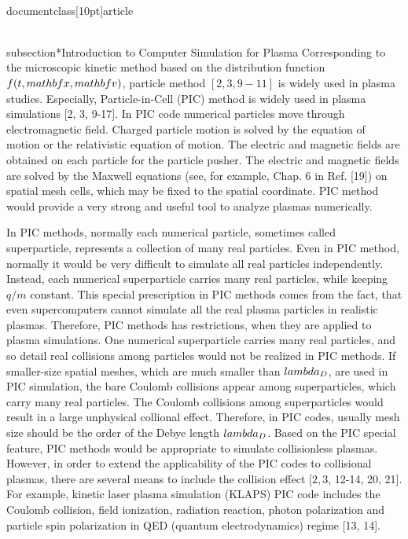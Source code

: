 \\documentclass[10pt]{article}
\begin{document}
\\subsection*{Introduction to Computer Simulation for Plasma}
Corresponding to the microscopic kinetic method based on the distribution function $f(t, \\mathbf{x}, \\mathbf{v})$, particle method $[2,3,9-11]$ is widely used in plasma studies. Especially, Particle-in-Cell (PIC) method is widely used in plasma simulations [2, 3, 9-17]. In PIC code numerical particles move through electromagnetic field. Charged particle motion is solved by the equation of motion or the relativistic equation of motion. The electric and magnetic fields are obtained on each particle for the particle pusher. The electric and magnetic fields are solved by the Maxwell equations (see, for example, Chap. 6 in Ref. [19]) on spatial mesh cells, which may be fixed to the spatial coordinate. PIC method would provide a very strong and useful tool to analyze plasmas numerically.

In PIC methods, normally each numerical particle, sometimes called superparticle, represents a collection of many real particles. Even in PIC method, normally it would be very difficult to simulate all real particles independently. Instead, each numerical superparticle carries many real particles, while keeping $q / m$ constant. This special prescription in PIC methods comes from the fact, that even supercomputers cannot simulate all the real plasma particles in realistic plasmas. Therefore, PIC methods has restrictions, when they are applied to plasma simulations. One numerical superparticle carries many real particles, and so detail real collisions among particles would not be realized in PIC methods. If smaller-size spatial meshes, which are much smaller than $\\lambda_{D}$, are used in PIC simulation, the bare Coulomb collisions appear among superparticles, which carry many real particles. The Coulomb collisions among superparticles would result in a large unphysical collional effect. Therefore, in PIC codes, usually mesh size should be the order of the Debye length $\\lambda_{D}$. Based on the PIC special feature, PIC methods would be appropriate to simulate collisionless plasmas. However, in order to extend the applicability of the PIC codes to collisional plasmas, there are several means to include the collision effect $[2,3$, 12-14, 20, 21]. For example, kinetic laser plasma simulation (KLAPS) PIC code includes the Coulomb collision, field ionization, radiation reaction, photon polarization and particle spin polarization in QED (quantum electrodynamics) regime [13, 14].
\end{document}
